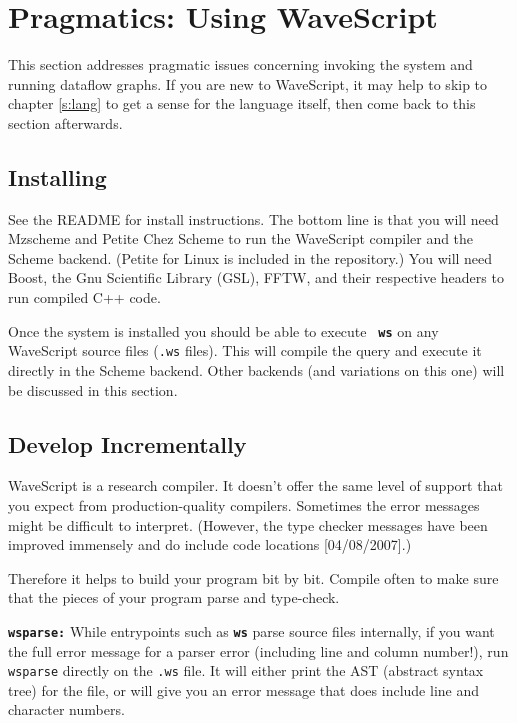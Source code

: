 \documentclass[twocolumn]{report}
\newcommand{\ws}{WaveScript}
\begin{document}
\section{Pragmatics: Using WaveScript}


This section addresses pragmatic issues concerning invoking
the system and running dataflow graphs.  If you are new to WaveScript,
it may help to skip to chapter \ref{s:lang} to get a sense for the
language itself, then come back to this section afterwards.

\subsection*{Installing}

See the README for install instructions.  The bottom line is that you
will need Mzscheme and Petite Chez Scheme to run the WaveScript
compiler and the Scheme backend.  (Petite for Linux is included in the
repository.)  You will need Boost, the Gnu Scientific Library (GSL),
FFTW, and their respective headers to run compiled C++ code.

Once the system is installed you should be able to execute {\bf \tt
  ws} on any WaveScript source files ({\tt .ws} files).  This will
compile the query and execute it directly in the Scheme backend.
Other backends (and variations on this one) will be discussed in this
section.  

\subsection*{Develop Incrementally}

WaveScript is a research compiler.  It doesn't offer the same
level of support that you expect from production-quality
compilers.  Sometimes the error messages might be difficult to
interpret.  (However, the type checker messages have been improved
immensely and do include code locations [04/08/2007].)

Therefore it helps to build your program bit by bit.  Compile often to make
sure that the pieces of your program parse and type-check.

{\tt \bf wsparse:} While entrypoints such as {\tt \bf ws} parse source files
internally, if you want the full error message for a parser error
(including line and column number!), run {\tt wsparse} directly on the
{\tt .ws} file.  It will either print the AST (abstract syntax tree) for the
file, or will give you an error message that does include line and
character numbers.
\end{document}
